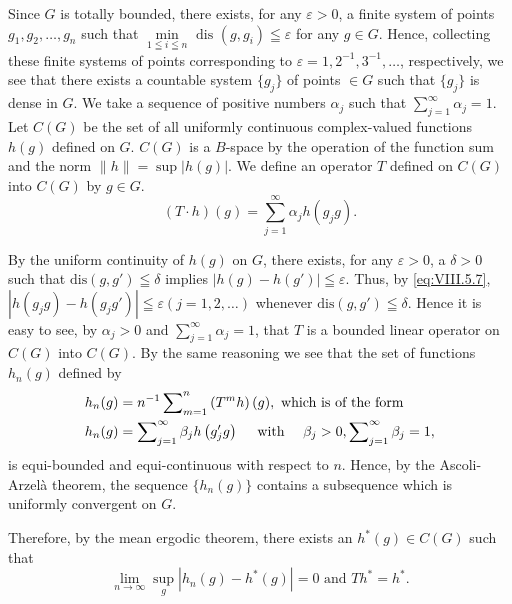Since $G$ is totally bounded, there exists, for any $\varepsilon > 0$, a finite system of points $g_1, g_2, \ldots, g_n$ such that $\min\limits_{1 \leqq i \leqq n} \text{ dis } (g, g_i) \leqq \varepsilon$ for any $g \in G$. Hence, collecting these finite systems of points corresponding to $\varepsilon = 1, 2^{-1}, 3^{-1}, \ldots$, respectively, we see that there exists a countable system $\{g_j\}$ of points $\in G$ such that $\{g_j\}$ is dense in $G$. We take a sequence of positive numbers $\alpha_j$ such that $\sum\limits_{j=1}^{\infty} \alpha_j = 1$. Let $C(G)$ be the set of all uniformly continuous complex-valued functions $h(g)$ defined on $G$. $C(G)$ is a $B$-space by the operation of the function sum and the norm $\|h\| = \sup |h(g)|$. We define an operator $T$ defined on $C(G)$ into $C(G)$ by $g \in G$. 
\begin{equation}\label{eq:VIII.5.15}
(T \cdot h) (g) = \sum\limits_{j=1} ^{\infty} \alpha_{j} h (g _{j} g).
\end{equation}

By the uniform continuity of $h(g)$ on $G$, there exists, for any $\varepsilon > 0$, a $\delta > 0$ such that $\mathrm{dis}(g, g') \leqq \delta$ implies $|h(g) - h(g')| \leqq \varepsilon$. Thus, by \eqref{eq:VIII.5.7}, $|h(g_j g) - h(g_j g')| \leqq \varepsilon (j = 1, 2, \ldots)$ whenever $\mathrm{dis}(g, g') \leqq \delta$. Hence it is easy to see, by $\alpha_j > 0$ and $\sum\limits_{j=1}^{\infty} \alpha_j = 1$, that $T$ is a bounded linear operator on $C(G)$ into $C(G)$. By the same reasoning we see that the set of functions $h_n(g)$ defined by 
\begin{align}
h _{n} (g)& = n ^{-1} \sum\limits_{m=1} ^{n} \left(T ^{m} h\right) (g), \text{ which is of the form } \notag \\
h _{n} (g)& = \sum\limits_{j=1} ^{\infty} \beta_{j} h \left(g _{j} ^{\prime} g\right) \quad \text{ with } \quad \beta_{j} > 0, \sum\limits_{j=1} ^{\infty} \beta_{j} = 1, \label{eq:VIII.5.16}
\end{align}
is equi-bounded and equi-continuous with respect to $n$. Hence, by the Ascoli-Arzelà theorem, the sequence $\{h_n(g)\}$ contains a subsequence which is uniformly convergent on $G$. 

Therefore, by the mean ergodic theorem, there exists an $h^*(g) \in C(G)$ such that 
\begin{equation}\label{eq:VIII.5.17}
\lim\limits _{n \rightarrow \infty} \sup\limits _{g} | h _{n} (g) - h ^{*} (g) | = 0 \text{ and } T h ^{*} = h ^{*}.
\end{equation}

